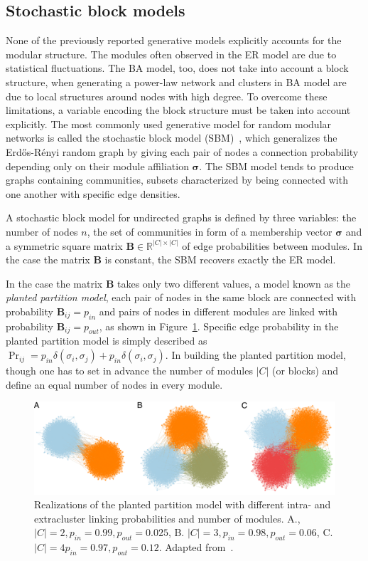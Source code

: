 \subsection{Stochastic block models}
None of the previously reported generative models explicitly accounts for the modular structure.
The modules often observed in the ER model are due to statistical fluctuations.
The BA model, too, does not take into account a block structure, when generating a power-law network and clusters in BA model are due to local structures around nodes with high degree.
To overcome these limitations, a variable encoding the block structure must be taken into account explicitly. 
The most commonly used generative model for random modular networks is called the stochastic block model (SBM)~\cite{holland1983}, which generalizes the Erd\H{o}s-Rényi random graph by giving each pair of nodes a connection probability depending only on their module affiliation $\boldsymbol \sigma$.
The SBM model tends to produce graphs containing communities, subsets characterized by being connected with one another with specific edge densities.

A stochastic block model for undirected graphs is defined by three variables: the number of nodes $n$, the set of communities in form of a membership vector $\boldsymbol \sigma$ and a symmetric square matrix  $\mathbf{B} \in \mathbb{R}^{|C| \times |C|}$ of edge probabilities between modules. In the case the matrix $\mathbf{B}$ is constant, the SBM recovers exactly the ER model.

In the case the matrix $\mathbf{B}$ takes only two different values, a model known as the \emph{planted partition model}, each pair of nodes in the same block are connected with probability $\mathbf{B}_{ij}=p_{in}$ and pairs of nodes in different modules are linked with probability $\mathbf{B}_{ij}=p_{out}$, as shown in Figure~\ref{fig:planted_peixoto}. Specific edge probability in the planted partition model is simply described as $\Pr_{ij} = p_{in}\delta(\sigma_i,\sigma_j) + p_{in}\delta(\sigma_i,\sigma_j)$.
In building the planted partition model, though one has to set in advance the number of modules $|C|$ (or blocks) and define an equal number of nodes in every module.

\begin{figure}[htb!]
\centering
\includegraphics[width=1.0\textwidth]{images/peixoto_block_models.pdf}
\caption{Realizations of the planted partition model with different intra- and extracluster linking probabilities and number of modules. A., $|C|=2, p_{in}=0.99, p_{out}=0.025$, B. $|C|=3, p_{in}=0.98, p_{out}=0.06$, C. $|C|=4 p_{in}=0.97, p_{out}=0.12$. Adapted from~\cite{peixoto2015}.}
\label{fig:planted_peixoto}
\end{figure}


